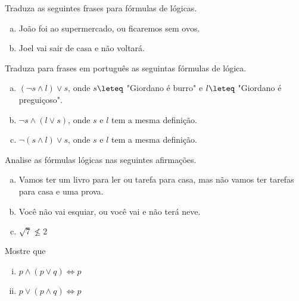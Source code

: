 \begin{exercise}
    Traduza as seguintes frases para fórmulas de lógicas.
    \begin{enumerate}[a)]
        \item João foi ao supermercado, ou ficaremos sem ovos.
        \item Joel vai sair de casa e não voltará.
    \end{enumerate}
\end{exercise}

\begin{exercise}
    Traduza para frases em português as seguintas fórmulas de lógica.
    \begin{enumerate}[a)]
        \item $(\lnot s \land l) \lor s$, onde $s \leteq$ "Giordano é burro" e 
            $l \leteq$ "Giordano é preguiçoso".
        \item $\lnot s \land (l \lor s)$, onde $s$ e $l$ tem a mesma definição.
        \item $\lnot(s \land l) \lor s$, onde $s$ e $l$ tem a mesma definição.
    \end{enumerate}
\end{exercise}

\begin{exercise}
    Analise as fórmulas lógicas nas seguintes afirmações.
    \begin{enumerate}[a)]
        \item Vamos ter um livro para ler ou tarefa para casa, mas não vamos ter
            tarefas para casa e uma prova.
        \item Você não vai esquiar, ou você vai e não terá neve.
        \item $\sqrt{7} \nleq 2$
    \end{enumerate}
\end{exercise}

\begin{exercise}
    Mostre que
    \begin{enumerate}[(i)]
        \item $p \land (p \lor q) \iff p$
        \item $p \lor (p \land q) \iff p$
    \end{enumerate}
\end{exercise}
